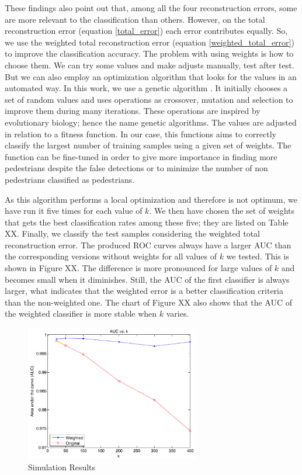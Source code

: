 \documentclass[10pt, conference, compsocconf]{IEEEtran}
\begin{document}
These findings also point out that, among all the four reconstruction errors, some are more relevant to the classification than others. However, on the total reconstruction error (equation \ref{total_error}) each error contributes equally. So, we use the weighted total reconstruction error (equation \ref{weighted_total_error}) to improve the classification accuracy. The problem with using weights is how to choose them. We can try some values and make adjusts manually, test after test. But we can also employ an optimization algorithm that looks for the values in an automated way. In this work, we use a genetic algorithm \cite{ga}. It initially chooses a set of random values and uses operations as crossover, mutation and selection to improve them during many iterations. These operations are inspired by evolutionary biology; hence the name genetic algorithms. The values are adjusted in relation to a fitness function. In our case, this functions aims to correctly classify the largest number of training samples using a given set of weights. The function can be fine-tuned in order to give more importance in finding more pedestrians despite the false detections or to minimize the number of non pedestrians classified as pedestrians.

As this algorithm performs a local optimization and therefore is not optimum, we have run it five times for each value of $k$. We then have chosen the set of weights that gets the best classification rates among these five; they are listed on Table XX. Finally, we classify the test samples considering the weighted total reconstruction error. The produced ROC curves always have a larger AUC than the corresponding versions without weights for all values of $k$ we tested. This is shown in Figure XX. The difference is more pronounced for large values of $k$ and becomes small when it diminishes. Still, the AUC of the first classifier is always larger, what indicates that the weighted error is a better classification criteria than the non-weighted one. The chart of Figure XX also shows that the AUC of the weighted classifier is more stable when $k$ varies.

\begin{figure}[t]
\centering
\includegraphics[width=3in]{chart_auc_vs_k}
\caption{Simulation Results}
\label{auc_vs_k}
\end{figure}
\end{document}
